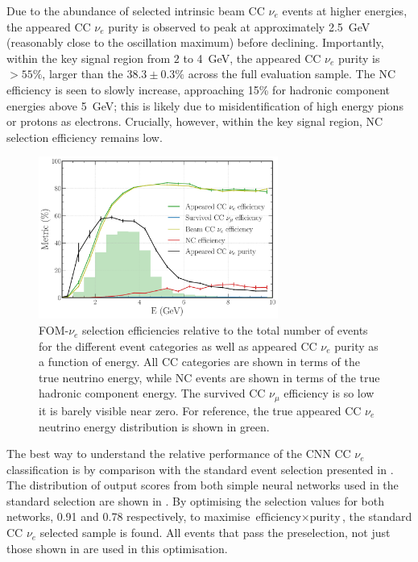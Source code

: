 Due to the abundance of selected intrinsic beam CC $\nu_{e}$ events at higher energies, the
appeared CC $\nu_{e}$ purity is observed to peak at approximately \SI{2.5}{\GeV} (reasonably close
to the oscillation maximum) before declining. Importantly, within the key signal region from $2$
to \SI{4}{\GeV}, the appeared CC $\nu_{e}$ purity is $>55\%$, larger than the $38.3\pm0.3\%$
across the full evaluation sample. The NC efficiency is seen to slowly increase, approaching 15\%
for hadronic component energies above \SI{5}{\GeV}; this is likely due to misidentification of
high energy pions or protons as electrons. Crucially, however, within the key signal region, NC
selection efficiency remains low.

\begin{figure} %
    \includegraphics[width=0.7\textwidth]{diagrams/7-results/final_nuel_hists.pdf}
    \caption[Efficiency of the CC $\nu_{e}$ selection as a function of energy]
    {FOM-$\nu_e$ selection efficiencies relative to the total number of events for the different
        event categories as well as appeared CC $\nu_{e}$ purity as a function of energy. All CC
        categories are shown in terms of the true neutrino energy, while NC events are shown in
        terms of the true hadronic component energy. The survived CC $\nu_{\mu}$ efficiency is so
        low it is barely visible near zero. For reference, the true appeared CC $\nu_{e}$ neutrino
        energy distribution is shown in green.}
    \label{fig:final_nuel_hists}
\end{figure}

The best way to understand the relative performance of the CNN CC $\nu_{e}$ classification is by
comparison with the standard event selection presented in . The
distribution of output scores from both simple neural networks used in the standard selection are
shown in . By optimising the selection values for both
networks, 0.91 and 0.78 respectively, to maximise $\text{efficiency}\times\text{purity}$, the
standard CC $\nu_{e}$ selected sample is found. All events that pass the preselection, not just
those shown in  are used in this optimisation.

